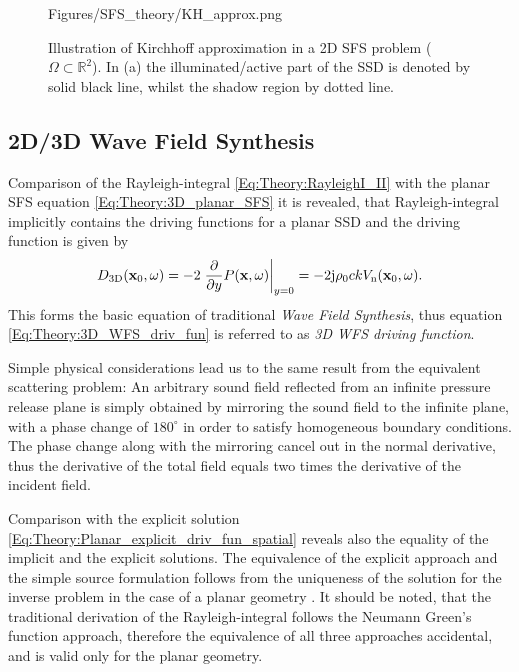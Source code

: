 \begin{figure}
	\centering
	\begin{overpic}[width = 1\columnwidth]{Figures/SFS_theory/KH_approx.png}
	\end{overpic}
\caption{Illustration of Kirchhoff approximation in a 2D SFS problem ($\Omega \subset \mathbb{R}^2$). In (a) the illuminated/active part of the SSD is denoted by solid black line, whilst the shadow region by dotted line.}
	\label{Fig:Theory:KH_approximation}
\end{figure}

\newpage
\subsection{2D/3D Wave Field Synthesis}

Comparison of the Rayleigh-integral \eqref{Eq:Theory:RayleighI_II} with the planar SFS equation \eqref{Eq:Theory:3D_planar_SFS} it is revealed, that Rayleigh-integral implicitly contains the driving functions for a planar SSD and the driving function is given by
\begin{equation}
D_{\mathrm{3D}}(\mathbf{x}_0,\omega) = -2 \left. \frac{\partial}{\partial y} P(\mathbf{x},\omega) \right|_{y = 0} = - 2 \mathrm{j} \rho_0 c k V_{\mathrm{n}}(\mathbf{x}_0,\omega).
\label{Eq:Theory:3D_WFS_driv_fun}
\end{equation}
This forms the basic equation of traditional \emph{Wave Field Synthesis}, thus equation \eqref{Eq:Theory:3D_WFS_driv_fun} is referred to as \emph{3D WFS driving function}.

Simple physical considerations lead us to the same result from the equivalent scattering problem:
An arbitrary sound field reflected from an infinite pressure release plane is simply obtained by mirroring the sound field to the infinite plane, with a phase change of $180^{\circ}$ in order to satisfy homogeneous boundary conditions. The phase change along with the mirroring cancel out in the normal derivative, thus the derivative of the total field equals two times the derivative of the incident field.

Comparison with the explicit solution \eqref{Eq:Theory:Planar_explicit_driv_fun_spatial} reveals also the equality of the implicit and the explicit solutions.
The equivalence of the explicit approach and the simple source formulation follows from the uniqueness of the solution for the inverse problem in the case of a planar geometry \cite{Fazi2010}.
It should be noted, that the traditional derivation of the Rayleigh-integral follows the Neumann Green's function approach, therefore the equivalence of all three approaches accidental, and is valid only for the planar geometry.

